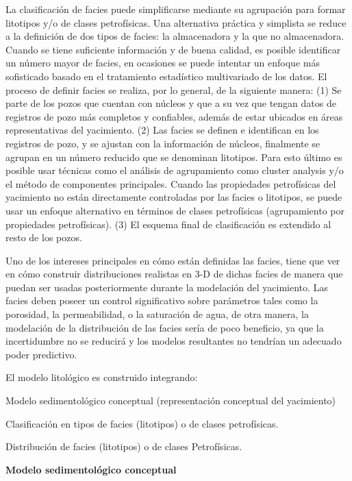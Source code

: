 La clasificaci\'on de facies puede simplificarse mediante su agrupaci\'on para formar litotipos y/o de clases petrof\'isicas. Una alternativa pr\'actica y simplista se reduce a la definici\'on de dos tipos de facies: la almacenadora y la que no almacenadora. Cuando se tiene suficiente informaci\'on y de buena calidad, es posible identificar un n\'umero mayor de facies, en ocasiones se puede intentar un enfoque m\'as sofisticado basado en el tratamiento estad\'istico multivariado de los datos. El proceso de definir facies se realiza, por lo general, de la siguiente manera: (1) Se parte de los pozos que cuentan con n\'ucleos y que a su vez que tengan datos de registros de pozo m\'as completos y confiables, adem\'as de estar ubicados en \'areas representativas del yacimiento. (2) Las facies se definen e identifican en los registros de pozo, y se ajustan con la informaci\'on de n\'ucleos, finalmente se agrupan en un n\'umero reducido que se denominan litotipos. Para esto \'ultimo es posible usar t\'ecnicas como el an\'alisis de agrupamiento como cluster analysis y/o el m\'etodo de componentes principales. Cuando las propiedades petrof\'isicas del yacimiento no est\'an directamente controladas por las facies o litotipos, se puede usar un enfoque alternativo en t\'erminos de clases petrof\'isicas (agrupamiento por propiedades petrof\'isicas). (3) El esquema final de clasificaci\'on es extendido al resto de los pozos.

Uno de los intereses principales en c\'omo est\'an definidas las facies, tiene que ver en c\'omo construir distribuciones realistas en 3-D de dichas facies de manera que puedan ser usadas posteriormente durante la modelaci\'on del yacimiento.  Las facies deben poseer un control significativo sobre par\'ametros tales como la porosidad, la permeabilidad, o la saturaci\'on de agua, de otra manera, la modelaci\'on de la distribuci\'on de las facies ser\'ia de poco beneficio, ya que la incertidumbre no se reducir\'a y los modelos resultantes no tendr\'ian un adecuado poder predictivo.

El modelo litol\'ogico es construido integrando:

Modelo sedimentol\'ogico conceptual (representaci\'on conceptual del yacimiento)

Clasificaci\'on en tipos de facies (litotipos) o de clases petrof\'isicas.

Distribuci\'on de facies (litotipos) o de clases Petrof\'isicas.

\textbf{Modelo sedimentol\'ogico conceptual}

